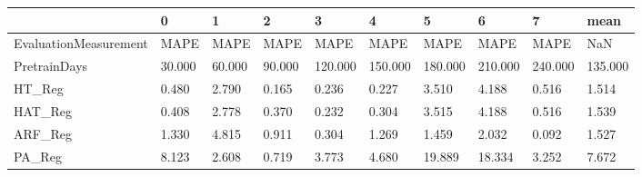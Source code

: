 \begin{tabular}{llllllllll}
\toprule
{} &       0 &       1 &       2 &        3 &        4 &        5 &        6 &        7 &     mean \\
\midrule
EvaluationMeasurement &    MAPE &    MAPE &    MAPE &     MAPE &     MAPE &     MAPE &     MAPE &     MAPE &      NaN \\
PretrainDays          &  30.000 &  60.000 &  90.000 &  120.000 &  150.000 &  180.000 &  210.000 &  240.000 &  135.000 \\
HT\_Reg                &   0.480 &   2.790 &   0.165 &    0.236 &    0.227 &    3.510 &    4.188 &    0.516 &    1.514 \\
HAT\_Reg               &   0.408 &   2.778 &   0.370 &    0.232 &    0.304 &    3.515 &    4.188 &    0.516 &    1.539 \\
ARF\_Reg               &   1.330 &   4.815 &   0.911 &    0.304 &    1.269 &    1.459 &    2.032 &    0.092 &    1.527 \\
PA\_Reg                &   8.123 &   2.608 &   0.719 &    3.773 &    4.680 &   19.889 &   18.334 &    3.252 &    7.672 \\
\bottomrule
\end{tabular}
